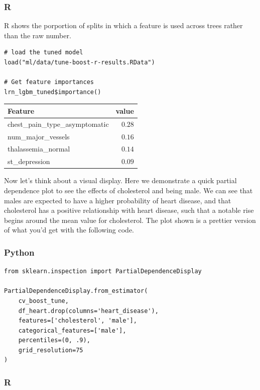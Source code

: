 \documentclass[
  letterpaper,
]{krantz}
\begin{document}
\subsubsection{R}

R shows the porportion of splits in which a feature is used across trees
rather than the raw number.

\begin{verbatim}
# load the tuned model
load("ml/data/tune-boost-r-results.RData")

# Get feature importances
lrn_lgbm_tuned$importance()
\end{verbatim}

\begin{longtable*}{lr}
\toprule
Feature & value \\ 
\midrule\addlinespace[2.5pt]
chest\_pain\_type\_asymptomatic & \textcolor[HTML]{404040}{$0.28$} \\ 
num\_major\_vessels & \textcolor[HTML]{404040}{$0.16$} \\ 
thalassemia\_normal & \textcolor[HTML]{404040}{$0.14$} \\ 
st\_depression & \textcolor[HTML]{404040}{$0.09$} \\ 
\bottomrule
\end{longtable*}

Now let's think about a visual display. Here we demonstrate a quick
partial dependence plot to see the effects of cholesterol and being
male. We can see that males are expected to have a higher probability of
heart disease, and that cholesterol has a positive relationship with
heart disease, such that a notable rise begins around the mean value for
cholesterol. The plot shown is a prettier version of what you'd get with
the following code.

\subsubsection{Python}

\begin{verbatim}
from sklearn.inspection import PartialDependenceDisplay

PartialDependenceDisplay.from_estimator(
    cv_boost_tune, 
    df_heart.drop(columns='heart_disease'), 
    features=['cholesterol', 'male'], 
    categorical_features=['male'], 
    percentiles=(0, .9),
    grid_resolution=75
)
\end{verbatim}

\subsubsection{R}
\end{document}
